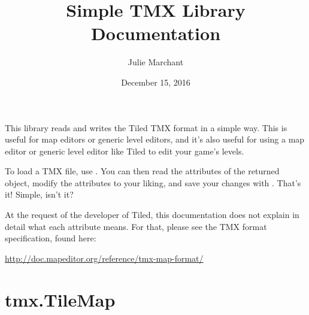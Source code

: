 \documentclass[letterpaper,10pt,english]{sphinxmanual}
\title{Simple TMX Library Documentation}
\date{December 15, 2016}
\author{Julie Marchant}
\begin{document}
\maketitle
\tableofcontents
{}\label{index::doc}

\label{index:module-tmx}
This library reads and writes the Tiled TMX format in a simple way.
This is useful for map editors or generic level editors, and it's also
useful for using a map editor or generic level editor like Tiled to edit
your game's levels.

To load a TMX file, use {\hyperref[index:tmx.TileMap.load]{\emph{}}}.  You can then read the
attributes of the returned {\hyperref[index:tmx.TileMap]{\emph{}}} object, modify the
attributes to your liking, and save your changes with
{\hyperref[index:tmx.TileMap.save]{\emph{}}}.  That's it!  Simple, isn't it?

At the request of the developer of Tiled, this documentation does not
explain in detail what each attribute means. For that, please see the
TMX format specification, found here:

\href{http://doc.mapeditor.org/reference/tmx-map-format/}{http://doc.mapeditor.org/reference/tmx-map-format/}


\chapter{tmx.TileMap}
\label{index:tmx-tilemap}\label{index:simple-tmx-library-documentation}
\end{document}
